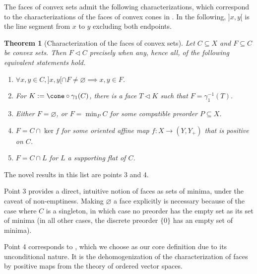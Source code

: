 \documentclass{article}
\theoremstyle{plain}
\newtheorem{theorem}{Theorem}[section]
\theoremstyle{definition}
\theoremstyle{remark}
\begin{document}
The faces of convex sets admit the following characterizations, 
which correspond to the characterizations of the faces of convex cones in . In the following,
$]x, y[$ is the line segment from $x$ to $y$ excluding both endpoints.
\begin{theorem}[Characterization of the faces of convex sets]
\label{loc:characterization_of_the_faces_of_convex_sets.statement}
Let $C \subseteq X$ and $F \subseteq C$ be convex sets.
Then $F \triangleleft C$ precisely when any, hence all, of the following equivalent statements hold.
\begin{enumerate}
\item $\forall x, y \in C, ]x, y[ \cap F \neq \varnothing \implies x, y \in F$.
\item For $K := \cone\circ\gamma_1(C)$, there is a face $T  \triangleleft K$ such that $F = \gamma_1^{-1}(T)$.
\item Either $F = \varnothing$, or $F = \min_{P} C$ for some compatible preorder $P \subseteq X$.
\item $F = C \cap \ker f$ for some oriented affine map $f:X \to (Y,Y_+)$ that is positive on $C$.
\item $F = C \cap L$ for $L$ a supporting flat of $C$.
\end{enumerate}
\end{theorem}
The novel results in this list are points 3 and 4. 

Point 3 provides a direct, intuitive notion of faces as sets of minima, under the caveat of non-emptiness. Making $\varnothing$ a face explicitly is necessary because of the case where $C$ is a singleton, in which case no preorder has the empty set as its set of minima (in all other cases, the discrete preorder $\{0\}$ has an empty set of minima).

Point 4 corresponds to , which we choose as
our core definition due to its unconditional nature. It is the dehomogenization
of the characterization of faces by positive maps from the theory of ordered vector spaces.
\end{document}
